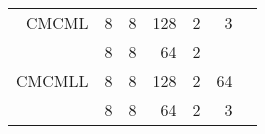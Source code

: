 \begin{table}[!ht]
\begin{tabular}{r|r|r|r|r|r|r}
CMCML  & 8             & 8      & 128    & 2            & 3      &                 \\       
       & 8             & 8      & 64     & 2            &        &                 \\ \hline
CMCMLL & 8             & 8      & 128    & 2            & 64     &                 \\       
       & 8             & 8      & 64     & 2            & 3      &                 \\ \hline

\end{tabular}
\end{table}